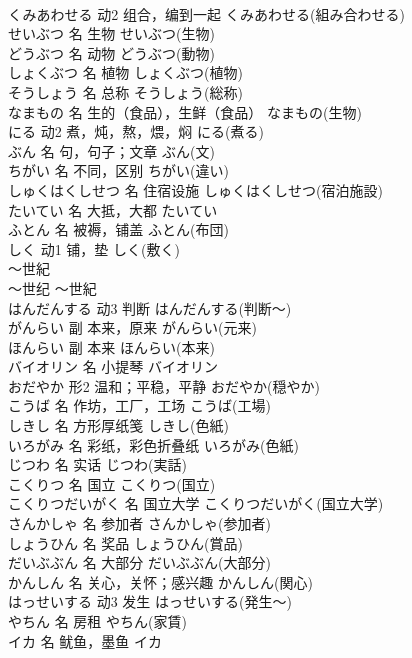 \documentclass[8pt]{extreport}
\begin{document}
\begin{CJK}{UTF8}{min}
\\	くみあわせる	动2	组合，编到一起	くみあわせる(組み合わせる)	
\\	せいぶつ	名	生物	せいぶつ(生物)	
\\	どうぶつ	名	动物	どうぶつ(動物)	
\\	しょくぶつ	名	植物	しょくぶつ(植物)	
\\	そうしょう	名	总称	そうしょう(総称)	
\\	なまもの	名	生的（食品），生鲜（食品）	なまもの(生物)	
\\	にる	动2	煮，炖，熬，煨，焖	にる(煮る)	
\\	ぶん	名	句，句子；文章	ぶん(文)	
\\	ちがい	名	不同，区别	ちがい(違い)	
\\	しゅくはくしせつ	名	住宿设施	しゅくはくしせつ(宿泊施設)	
\\	たいてい	名	大抵，大都	たいてい	
\\	ふとん	名	被褥，铺盖	ふとん(布団)	
\\	しく	动1	铺，垫	しく(敷く)	
\\	～世紀	
\\	～世纪	～世紀	
\\	はんだんする	动3	判断	はんだんする(判断～)	
\\	がんらい	副	本来，原来	がんらい(元来)	
\\	ほんらい	副	本来	ほんらい(本来)	
\\	バイオリン	名	小提琴	バイオリン	
\\	おだやか	形2	温和；平稳，平静	おだやか(穏やか)	
\\	こうば	名	作坊，工厂，工场	こうば(工場)	
\\	しきし	名	方形厚纸笺	しきし(色紙)	
\\	いろがみ	名	彩纸，彩色折叠纸	いろがみ(色紙)	
\\	じつわ	名	实话	じつわ(実話)	
\\	こくりつ	名	国立	こくりつ(国立)	
\\	こくりつだいがく	名	国立大学	こくりつだいがく(国立大学)	
\\	さんかしゃ	名	参加者	さんかしゃ(参加者)	
\\	しょうひん	名	奖品	しょうひん(賞品)	
\\	だいぶぶん	名	大部分	だいぶぶん(大部分)	
\\	かんしん	名	关心，关怀；感兴趣	かんしん(関心)	
\\	はっせいする	动3	发生	はっせいする(発生～)	
\\	やちん	名	房租	やちん(家賃)	
\\	イカ	名	鱿鱼，墨鱼	イカ	

\end{CJK}
\end{document}
